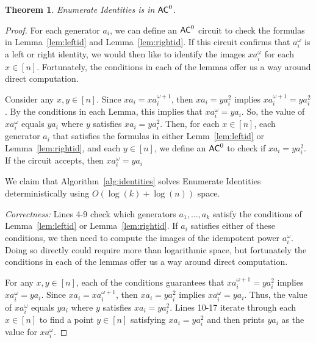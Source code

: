 \documentclass{amsart}
\newcommand{\AC}{\ensuremath\mathsf{AC}}
\newtheorem{theorem}{Theorem}[section]
\theoremstyle{remark}
\numberwithin{equation}{section}
\begin{document}
\begin{theorem}
Enumerate Identities is in $\AC^0$.
\end{theorem}
\begin{proof}
For each generator $a_i$, we can define an $\AC^0$ circuit to check the formulas in Lemma~\ref{lem:leftid} and Lemma~\ref{lem:rightid}. If this circuit confirms that $a_i^\omega$ is a left or right identity, we would then like to identify the images $xa_i^\omega$ for each $x \in [n]$. Fortunately, the conditions in each of the lemmas offer us a way around direct computation.

Consider any $x,y \in [n]$. Since $xa_i = xa_i^{\omega+1}$, then $xa_i = ya_i^2$ implies $xa_i^{\omega+1} = ya_i^2$. By the conditions in each Lemma, this implies that $xa_i^\omega = ya_i$. So, the value of $xa_i^\omega$ equals $ya_i$ where $y$ satisfies $xa_i = ya_i^2$. Then, for each $x \in [n]$, each generator $a_i$ that satisfies the formulas in either Lemm~\ref{lem:leftid} or Lemma~\ref{lem:rightid}, and each $y \in [n]$, we define an $\AC^0$ to check if $xa_i = ya_i^2$. If the circuit accepts, then $xa_i^\omega = ya_i$

\iffalse
We claim that Algorithm~\ref{alg:identities} solves Enumerate Identities deterministically using $O(\log(k)+\log(n))$ space.

\emph{Correctness:} Lines 4-9 check which generators $a_1,\dots,a_k$ satisfy the conditions of Lemma~\ref{lem:leftid} or Lemma~\ref{lem:rightid}. If $a_i$ satisfies either of these conditions, we then need to compute the images of the idempotent power $a_i^\omega$. Doing so directly could require more than logarithmic space, but fortunately the conditions in each of the lemmas offer us a way around direct computation.

For any $x,y \in [n]$, each of the conditions guarantees that $xa_i^{\omega+1} = y a_i^2$ implies $xa_i^\omega = ya_i$. Since $xa_i = xa_i^{\omega+1}$, then $xa_i = ya_i^2$ implies $xa_i^\omega = ya_i$. Thus, the value of $xa_i^\omega$ equals $ya_i$ where $y$ satisfies $xa_i = ya_i^2$. Lines 10-17 iterate through each $x \in [n]$ to find a point $y \in [n]$ satisfying $xa_i = ya_i^2$ and then prints $ya_i$ as the value for $xa_i^\omega$.


\end{proof}
\end{document}
